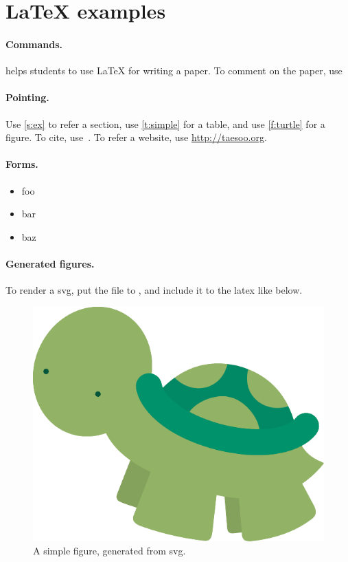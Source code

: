 \section{{\LaTeX} examples}
\label{s:ex}

\paragraph{Commands.}
\sys helps students to use {\LaTeX} for writing a paper.
To comment on the paper, use

\paragraph{Pointing.}
Use \autoref{s:ex} to refer a section, 
use \autoref{t:simple} for a table,
and use \autoref{f:turtle} for a figure. 
To cite, use~\cite{kim:userfs,kim:poirot}. 
To refer a website, use \url{http://taesoo.org}. 

\paragraph{Forms.}

\begin{itemize}[noitemsep,nolistsep]
 \setlength{\itemsep}{-0pt}
 \item foo
 \item bar
 \item baz
\end{itemize}

\paragraph{Generated figures.}

To render a svg, put the file to , and include 
it to the latex like below. 

\begin{figure}[h]
\centering
\footnotesize
\includegraphics[width=0.5\columnwidth]{fig/ex-turtle}
\caption{A simple figure, generated from svg.}
\label{f:turtle}
\end{figure}

